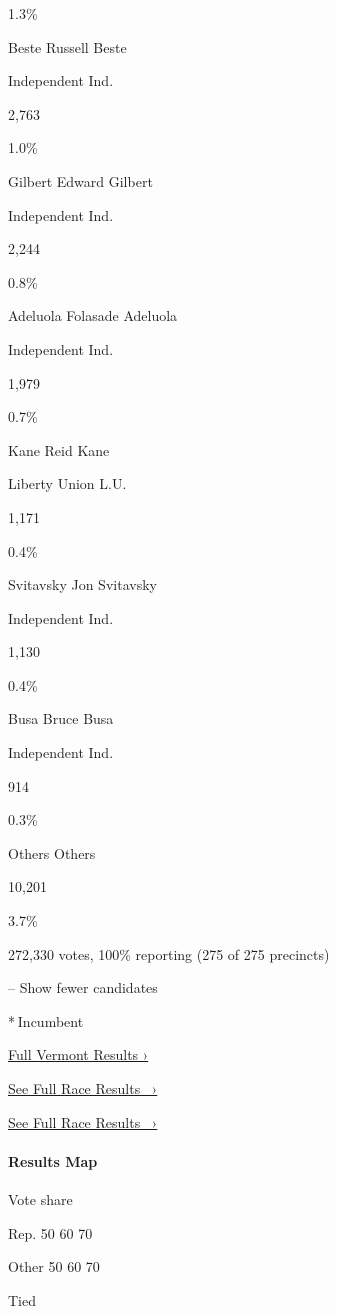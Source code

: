 1.3\%

 Beste Russell Beste

Independent Ind.

2,763

1.0\%

 Gilbert Edward Gilbert

Independent Ind.

2,244

0.8\%

 Adeluola Folasade Adeluola

Independent Ind.

1,979

0.7\%

 Kane Reid Kane

Liberty Union L.U.

1,171

0.4\%

 Svitavsky Jon Svitavsky

Independent Ind.

1,130

0.4\%

 Busa Bruce Busa

Independent Ind.

914

0.3\%

 Others Others

10,201

3.7\%

272,330 votes, 100\% reporting (275 of 275 precincts)

-- Show fewer candidates

* Incumbent

\href{https://www.nytimes3xbfgragh.onion/interactive/2018/11/06/us/elections/results-vermont-elections.html}{Full
Vermont Results ›}

\href{https://www.nytimes3xbfgragh.onion/elections/results/vermont-senate}{See
Full Race Results~ ›}

\href{https://www.nytimes3xbfgragh.onion/elections/results/vermont-senate}{See
Full Race Results~ ›}

\hypertarget{results-map}{%
\paragraph{Results Map}\label{results-map}}

Vote share

Rep. 50 60 70

Other 50 60 70

Tied


